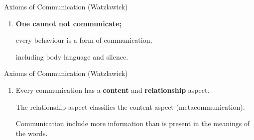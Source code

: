 



\newcommand{\myax}[1]{
    \item 
    \begin{minipage}[t]{0.7\textwidth}
        #1
    \end{minipage}
}
\begin{frame}{Axioms of Communication (Watzlawick)}
    \begin{enumerate}
        \myax{ \textbf{One cannot not communicate;}\par\medskip every behaviour is a form of communication,\par\medskip  including body language and silence.}
        \end{enumerate}
\end{frame}

\begin{frame}{Axioms of Communication (Watzlawick)}\begin{enumerate}
        
        \myax{Every communication has a \textbf{content} and \textbf{relationship} aspect.\par\medskip The relationship aspect classifies the content aspect (metacommunication).\par\medskip Communication include more information than is present in the meanings of the words.}
        \end{enumerate}
\end{frame}

